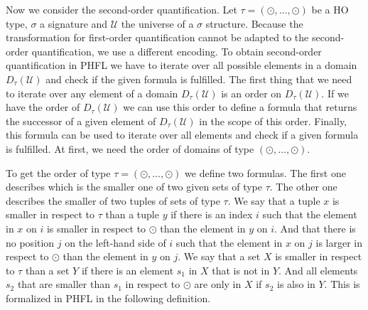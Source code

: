 Now we consider the second-order quantification. Let $\tau = (\odot, \dots, \odot)$ be a HO type, $\sigma$ a signature and
$\mathcal{U}$ the universe of a $\sigma$ structure. Because the transformation for first-order quantification cannot be adapted to the second-order quantification, we use a different encoding. To obtain second-order
quantification in PHFL we have to iterate over all possible elements in a domain $D_\tau(\mathcal{U})$ and
check if the given formula is fulfilled. The first thing that we need to iterate over any element of a domain
$D_\tau(\mathcal{U})$ is an order on $D_\tau(\mathcal{U})$. If we have the order of $D_\tau(\mathcal{U})$ we can use
this order to define a formula that returns the successor of a given element of $D_\tau(\mathcal{U})$ in the scope
of this order. Finally, this formula can be used to iterate over all elements and check if a given formula is
fulfilled.
At first, we need the order of domains of type $(\odot, \dots, \odot)$.

To get the order of type $\tau = (\odot, \dots, \odot)$ we define two formulas. The first one describes which is the smaller one of two given sets of type $\tau$. The other one describes the smaller of two tuples of sets of type $\tau$. We say that a tuple $x$ is smaller in respect to $
\tau$ than a tuple $y$ if there is an index $i$ such that the element in $x$ on $i$ is smaller in 
respect to $\odot$ than the element in $y$ on $i$. And that there is no position $j$ on the left-hand side of $i$ such 
that the element in $x$ on $j$ is larger in respect to $\odot$ than the element in $y$ on $j$. 
We say that a set $X$ is smaller in respect to $\tau$ than a set $Y$ if there is an element 
$s_1$ in $X$ that is not in $Y$. And all elements $s_2$ that are smaller than $s_1$ in respect to $\odot$ 
are only in $X$ if $s_2$ is also in $Y$. This is formalized in PHFL in the following definition.

